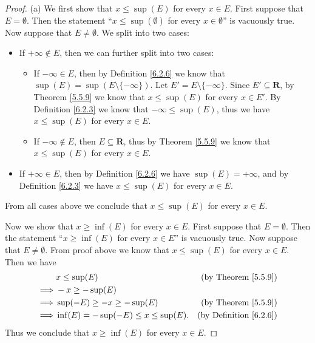 \begin{proof}{(a)}
    We first show that \(x \leq \sup(E)\) for every \(x \in E\).
    First suppose that \(E = \emptyset\).
    Then the statement ``\(x \leq \sup(\emptyset)\) for every \(x \in \emptyset\)'' is vacuously true.
    Now suppose that \(E \neq \emptyset\).
    We split into two cases:
    \begin{itemize}
        \item If \(+\infty \not\in E\), then we can further split into two cases:
              \begin{itemize}
                  \item If \(-\infty \in E\), then by Definition \ref{6.2.6} we know that \(\sup(E) = \sup(E \setminus \{-\infty\})\).
                        Let \(E' = E \setminus \{-\infty\}\).
                        Since \(E' \subseteq \mathbf{R}\), by Theorem \ref{5.5.9} we know that \(x \leq \sup(E)\) for every \(x \in E'\).
                        By Definition \ref{6.2.3} we know that \(-\infty \leq \sup(E)\), thus we have \(x \leq \sup(E)\) for every \(x \in E\).
                  \item If \(-\infty \notin E\), then \(E \subseteq \mathbf{R}\), thus by Theorem \ref{5.5.9} we know that \(x \leq \sup(E)\) for every \(x \in E\).
              \end{itemize}
        \item If \(+\infty \in E\), then by Definition \ref{6.2.6} we have \(\sup(E) = +\infty\), and by Definition \ref{6.2.3} we have \(x \leq \sup(E)\) for every \(x \in E\).
    \end{itemize}
    From all cases above we conclude that \(x \leq \sup(E)\) for every \(x \in E\).

    Now we show that \(x \geq \inf(E)\) for every \(x \in E\).
    First suppose that \(E = \emptyset\).
    Then the statement ``\(x \geq \inf(E)\) for every \(x \in E\)'' is vacuously true.
    Now suppose that \(E \neq \emptyset\).
    From proof above we know that \(x \leq \sup(E)\) for every \(x \in E\).
    Then we have
    \begin{align*}
                 & x \leq \sup(E)                           & \text{(by Theorem \ref{5.5.9})}    \\
        \implies & -x \geq -\sup(E)                                                              \\
        \implies & \sup(-E) \geq -x \geq -\sup(E)           & \text{(by Theorem \ref{5.5.9})}    \\
        \implies & \inf(E) = -\sup(-E) \leq x \leq \sup(E). & \text{(by Definition \ref{6.2.6})}
    \end{align*}
    Thus we conclude that \(x \geq \inf(E)\) for every \(x \in E\).
\end{proof}


